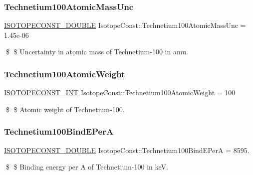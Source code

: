 \subsubsection{\texorpdfstring{Technetium100\+Atomic\+Mass\+Unc}{Technetium100AtomicMassUnc}}
{\footnotesize\ttfamily \mbox{\hyperlink{group___isotope_const-_macros_ga8f45a7272ce02c0b4c65c44636ed719a}{I\+S\+O\+T\+O\+P\+E\+C\+O\+N\+S\+T\+\_\+\+D\+O\+U\+B\+LE}} Isotope\+Const\+::\+Technetium100\+Atomic\+Mass\+Unc = 1.\+45e-\/06}

\$ \$ Uncertainty in atomic mass of Technetium-\/100 in amu. \mbox{\label{group___isotope_const-_technetium-_tc100_gaec4fff059aa0d8e8ec46a0a901a1b5e2}} 
\subsubsection{\texorpdfstring{Technetium100\+Atomic\+Weight}{Technetium100AtomicWeight}}
{\footnotesize\ttfamily \mbox{\hyperlink{group___isotope_const-_macros_ga5f18360b3e99483a35c32d789e62621c}{I\+S\+O\+T\+O\+P\+E\+C\+O\+N\+S\+T\+\_\+\+I\+NT}} Isotope\+Const\+::\+Technetium100\+Atomic\+Weight = 100}

\$ \$ Atomic weight of Technetium-\/100. \mbox{\label{group___isotope_const-_technetium-_tc100_gae555f4a19d116dfe546f5c63f6873ea8}} 
\subsubsection{\texorpdfstring{Technetium100\+Bind\+E\+PerA}{Technetium100BindEPerA}}
{\footnotesize\ttfamily \mbox{\hyperlink{group___isotope_const-_macros_ga8f45a7272ce02c0b4c65c44636ed719a}{I\+S\+O\+T\+O\+P\+E\+C\+O\+N\+S\+T\+\_\+\+D\+O\+U\+B\+LE}} Isotope\+Const\+::\+Technetium100\+Bind\+E\+PerA = 8595.}

\$ \$ Binding energy per A of Technetium-\/100 in keV. \mbox{\label{group___isotope_const-_technetium-_tc100_ga909be309c7efa934db7de62ccde4f71a}} 
